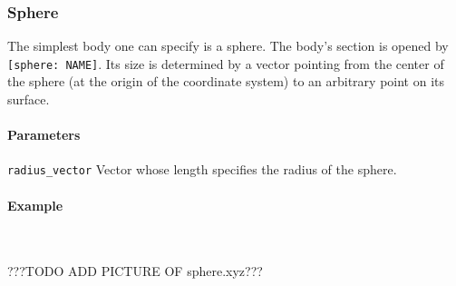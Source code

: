 \subsubsection{Sphere}
The simplest body one can specify is a sphere. The body's section is opened by \lstinline{[sphere: NAME]}. Its size is determined by a  vector pointing from the center of the sphere (at the origin of the coordinate system) to an arbitrary point on its surface.


\paragraph{Parameters}
\begin{description}
 \item{\lstinline{radius_vector}} Vector whose length specifies the radius of the sphere.
\end{description}

\paragraph{Example}\ 


???TODO ADD PICTURE OF sphere.xyz???